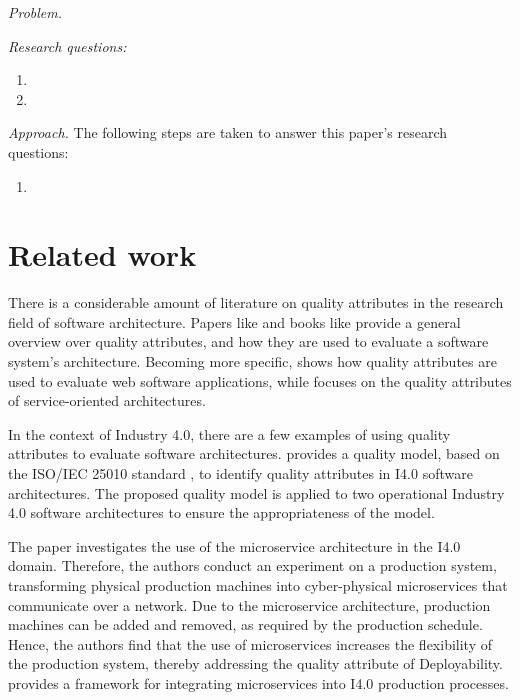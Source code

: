 \documentclass[conference]{IEEEtran}
\begin{document}
\label{sec:problem}
\emph{Problem.}
  

\emph{Research questions:}
\begin{enumerate}
    \item  
    \item 
\end{enumerate}


\emph{Approach.}
The following steps are taken to answer this paper's research questions: 
\begin{enumerate}
    \item 
\end{enumerate}



\section{Related work}
\label{sec:related_work}

There is a considerable amount of literature on quality attributes in the research field of software architecture. Papers like \cite{barbacci_quality_1995}  and books like \cite{bass_software_2003} provide a general overview over quality attributes, and how they are used to evaluate a software system’s architecture. Becoming more specific, \cite{offutt_quality_2002} shows how quality attributes are used to evaluate web software applications, while \cite{obrien_quality_2007} focuses on the quality attributes of service-oriented architectures.

In the context of Industry 4.0, there are a few examples of using quality attributes to evaluate software architectures. \cite{antonino_quality_2022} provides a quality model, based on the ISO/IEC 25010 standard \cite{noauthor_isoiec_2011}, to identify quality attributes in I4.0 software architectures. The proposed quality model is applied to two operational Industry 4.0 software architectures to ensure the appropriateness of the model.

The paper \cite{thramboulidis_cyber-physical_2018} investigates the use of the microservice architecture in the I4.0 domain. Therefore, the authors conduct an experiment on a production system, transforming physical production machines into cyber-physical microservices that communicate over a network. Due to the microservice architecture, production machines can be added and removed, as required by the production schedule. Hence, the authors find that the use of microservices increases the flexibility of the production system, thereby addressing the quality attribute of Deployability. \cite{thramboulidis_cpus-iot_2019} provides a framework for integrating microservices into I4.0 production processes.
\end{document}
